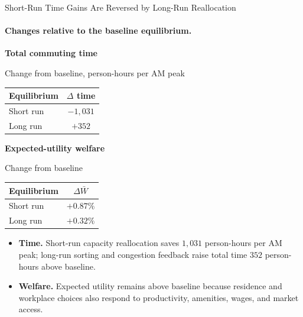 \documentclass[11pt,aspectratio=169]{beamer}
\newcommand{\good}[1]{\textcolor{blue!70!black}{#1}}
\newcommand{\bad}[1]{\textcolor{red!70!black}{#1}}
\begin{document}
\begin{frame}[label=result2]{Short-Run Time Gains Are Reversed by Long-Run Reallocation}
\framesubtitle{Changes relative to the baseline equilibrium.}
\centering
\begin{minipage}[t]{0.60\textwidth}
\centering
\small\textbf{Total commuting time}\par
\vspace{0.1em}
{\scriptsize Change from baseline, person-hours per AM peak}\par
\vspace{0.35em}
\scriptsize
\renewcommand{\arraystretch}{1.18}
\setlength{\tabcolsep}{9pt}
\begin{tabular}{lc}
\toprule
Equilibrium & $\Delta$ time \\
\midrule
Short run & \good{$-1{,}031$} \\
Long run & \bad{$+352$} \\
\bottomrule
\end{tabular}
\end{minipage}\hfill
\begin{minipage}[t]{0.31\textwidth}
\centering
\small\textbf{Expected-utility welfare}\par
\vspace{0.1em}
{\scriptsize Change from baseline}\par
\vspace{0.35em}
\scriptsize
\renewcommand{\arraystretch}{1.18}
\begin{tabular}{lc}
\toprule
Equilibrium & $\Delta\bar W$ \\
\midrule
Short run & \good{$+0.87\%$} \\
Long run & \good{$+0.32\%$} \\
\bottomrule
\end{tabular}
\end{minipage}

\vspace{0.65em}
\begin{itemize}\footnotesize\setlength\itemsep{0.35em}
  \item \textbf{Time.} Short-run capacity reallocation saves $1{,}031$ person-hours per AM peak; long-run sorting and congestion feedback raise total time $352$ person-hours above baseline.
  \item \textbf{Welfare.} Expected utility remains above baseline because residence and workplace choices also respond to productivity, amenities, wages, and market access.
\end{itemize}
\end{frame}
\end{document}

